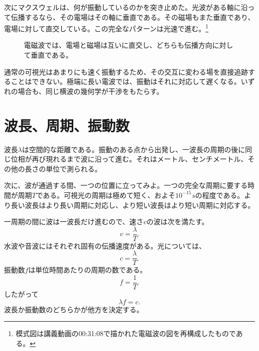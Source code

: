 次にマクスウェルは、何が振動しているのかを突き止めた。光波がある軸に沿って伝播するなら、その電場はその軸に垂直である。その磁場もまた垂直であり、電場に対して直交している。この完全なパターンは光速で進む。\footnote{模式図は講義動画の00:31:08で描かれた電磁波の図を再構成したものである。}

\begin{figure}[h]
\centering
{}
\caption{電磁波では、電場と磁場は互いに直交し、どちらも伝播方向に対して垂直である。}
\end{figure}

通常の可視光はあまりにも速く振動するため、その交互に変わる場を直接追跡することはできない。極端に長い電波では、振動はそれに対応して遅くなる。いずれの場合も、同じ横波の幾何学が干渉をもたらす。

\section{波長、周期、振動数}

波長\(\lambda\)は空間的な距離である。振動のある点から出発し、一波長の周期の後に同じ位相が再び現れるまで波に沿って進む。それはメートル、センチメートル、その他の長さの単位で測られる。

次に、波が通過する間、一つの位置に立ってみよ。一つの完全な周期に要する時間が周期\(T\)である。可視光の周期は極めて短く、およそ\(10^{-15}\,\mathrm{s}\)の程度である。より長い波長はより長い周期に対応し、より短い波長はより短い周期に対応する。

一周期の間に波は一波長だけ進むので、速さ\(v\)の波は次を満たす。
\begin{equation}
v=\frac{\lambda}{T}.
\end{equation}
水波や音波にはそれぞれ固有の伝播速度がある。光については、
\begin{equation}
c=\frac{\lambda}{T}.
\end{equation}
振動数\(f\)は単位時間あたりの周期の数である。
\begin{equation}
f=\frac{1}{T}.
\end{equation}
したがって
\begin{equation}
\lambda f=c.
\end{equation}
波長か振動数のどちらかが他方を決定する。

